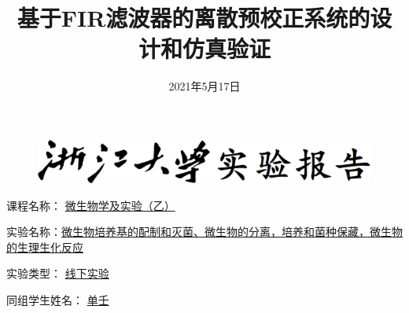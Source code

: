 \documentclass{../source/Experiment1}
\title{基于FIR滤波器的离散预校正系统的设计和仿真验证}
\date{2021年5月17日}
\begin{document}
    \makecover
    \begin{figure}[h]
        \centering
        \begin{minipage}{0.7\linewidth}
          \centerline{\includegraphics[width=\linewidth]{../source/logo/head.jpg}}
        \end{minipage}
    \end{figure}
      
      
          课程名称： \underline{微生物学及实验（乙）}   
          
          实验名称：\underline{微生物培养基的配制和灭菌、微生物的分离，培养和菌种保藏，微生物的生理生化反应}
          
          实验类型： \underline{线下实验} 
          
          同组学生姓名： \underline{单壬}
\end{document}
